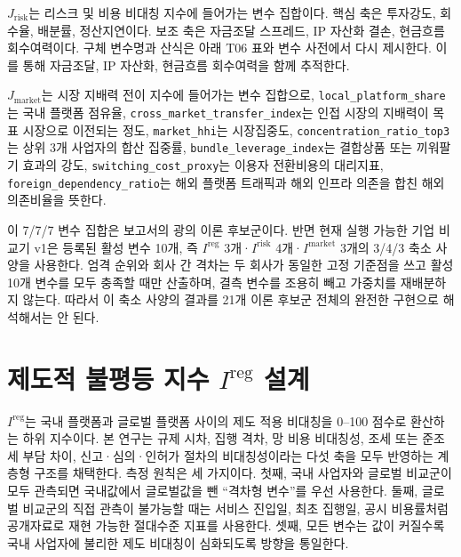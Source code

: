 \documentclass[11pt,a4paper]{report}
\begin{document}
$J_{\mathrm{risk}}$는 리스크 및 비용 비대칭 지수에 들어가는 변수 집합이다. 핵심 축은 투자강도, 회수율, 배분률, 정산지연이다. 보조 축은 자금조달 스프레드, IP 자산화 결손, 현금흐름 회수여력이다. 구체 변수명과 산식은 아래 T06 표와 변수 사전에서 다시 제시한다. 이를 통해 자금조달, IP 자산화, 현금흐름 회수여력을 함께 추적한다.

$J_{\mathrm{market}}$는 시장 지배력 전이 지수에 들어가는 변수 집합으로, \texttt{local\_platform\_share}는 국내 플랫폼 점유율, \nolinkurl{cross_market_transfer_index}는 인접 시장의 지배력이 목표 시장으로 이전되는 정도, \texttt{market\_hhi}는 시장집중도, \texttt{concentration\_ratio\_top3}는 상위 3개 사업자의 합산 집중률, \texttt{bundle\_leverage\_index}는 결합상품 또는 끼워팔기 효과의 강도, \texttt{switching\_cost\_proxy}는 이용자 전환비용의 대리지표, \texttt{foreign\_dependency\_ratio}는 해외 플랫폼 트래픽과 해외 인프라 의존을 합친 해외의존비율을 뜻한다.

이 7/7/7 변수 집합은 보고서의 광의 이론 후보군이다. 반면 현재 실행 가능한 기업 비교기 v1은 등록된 활성 변수 10개, 즉 $I^{\mathrm{reg}}$ 3개·$I^{\mathrm{risk}}$ 4개·$I^{\mathrm{market}}$ 3개의 3/4/3 축소 사양을 사용한다. 엄격 순위와 회사 간 격차는 두 회사가 동일한 고정 기준점을 쓰고 활성 10개 변수를 모두 충족할 때만 산출하며, 결측 변수를 조용히 빼고 가중치를 재배분하지 않는다. 따라서 이 축소 사양의 결과를 21개 이론 후보군 전체의 완전한 구현으로 해석해서는 안 된다.

\section{\texorpdfstring{제도적 불평등 지수 $I^{\mathrm{reg}}$ 설계}{제도적 불평등 지수 Ireg 설계}}
$I^{\mathrm{reg}}$는 국내 플랫폼과 글로벌 플랫폼 사이의 제도 적용 비대칭을 0--100 점수로 환산하는 하위 지수이다. 본 연구는 규제 시차, 집행 격차, 망 비용 비대칭성, 조세 또는 준조세 부담 차이, 신고·심의·인허가 절차의 비대칭성이라는 다섯 축을 모두 반영하는 계층형 구조를 채택한다. 측정 원칙은 세 가지이다. 첫째, 국내 사업자와 글로벌 비교군이 모두 관측되면 국내값에서 글로벌값을 뺀 ``격차형 변수''를 우선 사용한다. 둘째, 글로벌 비교군의 직접 관측이 불가능할 때는 서비스 진입일, 최초 집행일, 공시 비용률처럼 공개자료로 재현 가능한 절대수준 지표를 사용한다. 셋째, 모든 변수는 값이 커질수록 국내 사업자에 불리한 제도 비대칭이 심화되도록 방향을 통일한다.
\end{document}

